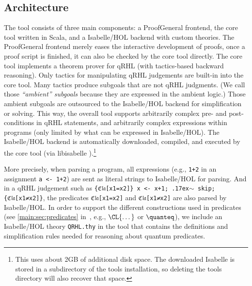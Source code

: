 \documentclass{article}
\newcommand\mytilde{\raise.17ex\hbox{$\scriptstyle\sim$}}
\newcommand\qrhlautoref[1]{\autoref*{main:#1} in~\cite{qrhl-paper-from-manual}}
\begin{document}





\subsection{Architecture}

The tool consists of three main components: a ProofGeneral
\cite{proofgeneral} frontend, the core tool written in Scala, and a
Isabelle/HOL \cite{isabelle} backend with custom theories. The
ProofGeneral frontend merely eases the interactive development of
proofs, once a proof script is finished, it can also be checked by the
core tool directly. The core tool implements a theorem prover for qRHL
(with tactics-based backward reasoning). Only tactics for manipulating
qRHL judgements are built-in into the core tool. Many tactics produce
subgoals that are not qRHL judgments.
(We call those \emph{``ambient'' subgoals}%
 because they are expressed in the ambient logic.)
Those ambient subgoals are outsourced to
the Isabelle/HOL backend for simplification or solving. This way, the
overall tool supports arbitrarily complex pre- and post-conditions in
qRHL statements, and arbitrarily complex expressions within programs
(only limited by what can be expressed in Isabelle/HOL). The
Isabelle/HOL backend is automatically downloaded, compiled, and
executed by the core tool (via libisabelle \cite{libisabelle}).\footnote{This
  uses about 2GB of additional disk space.
  The downloaded Isabelle is stored in a subdirectory of the tools installation,
  so deleting the tools directory will also recover that space.}
  

More precisely, when parsing a program, all expressions (e.g.,
\texttt{1+2} in an assignment \texttt{a <- 1+2}) are sent as literal
strings to Isabelle/HOL for parsing. And in a qRHL judgement such as
\texttt{\{ℭ𝔩𝔞[x1=x2]\} x <- x+1; \mytilde{} skip; \{ℭ𝔩𝔞[x1≠x2]\}}, the
predicates \texttt{ℭ𝔩𝔞[x1=x2]} and \texttt{ℭ𝔩𝔞[x1≠x2]} are also parsed
by Isabelle/HOL. In order to support the different constructions used
in predicates (see \qrhlautoref{sec:predicates}, e.g., $\CL{\dots}$
or $\quanteq$),
we include an Isabelle/HOL theory \texttt{QRHL.thy} in the tool that
contains the definitions and simplification rules needed for reasoning
about quantum predicates.
\end{document}

